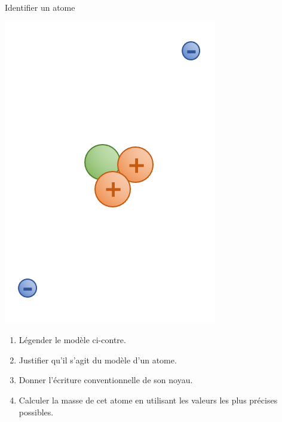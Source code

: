 \documentclass[12pt,a4paper]{article}
\begin{document}
\begin{exo}{Identifier un atome}

\begin{multicols}{2}
\begin{center}
\includegraphics[scale=1]{images/he3.png}
\end{center}

\begin{enumerate}
\item \rco{} 

Légender le modèle ci-contre.

\item \com{} 

Justifier qu'il s'agit du modèle d'un atome.

\item \rea{} 

Donner l'écriture conventionnelle de son noyau.

\item \rea{} 

Calculer la masse de cet atome en utilisant les valeurs les plus précises possibles.
\end{enumerate}
\end{multicols}
\end{exo}
\end{document}

